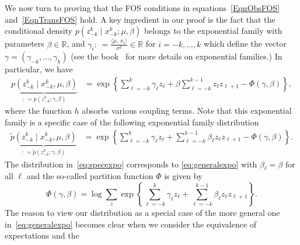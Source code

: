\documentclass[twoside,11pt]{article}
\newcommand{\inprod}[2]{\ensuremath{\langle #1 , \, #2 \rangle}}
\newcommand{\generalp}{\tilde{p}}
\newcommand{\paramobs}{\mu}
\newcommand{\paramtrans}{\beta}
\newcommand{\paramgamma}{\gamma}
\newcommand{\expcum}{\Phi}
\newcommand{\real}{\ensuremath{\mathbb{R}}}
\newcommand{\defn}{: \, = }
\newcommand{\kdim}{\ensuremath{k}}
\begin{document}
We now turn to proving that the FOS conditions in
equations~\eqref{EqnObsFOS} and~\eqref{EqnTransFOS} hold.  A key
ingredient in our proof is the fact that the conditional density
$p(z_{-\kdim}^\kdim \mid x_{-\kdim}^\kdim; \paramobs, \paramtrans)$
belongs to the exponential family with parameters $\paramtrans \in
\real$, and $\paramgamma_i \defn \frac{\inprod{\mu}{x_i}}{\sigma^2}
\in \real$ for $i=-k, \ldots, \kdim$ which define the vector
$\paramgamma = (\gamma_{-k}, \dots, \gamma_k)$ (see the book~\cite{WaiJor08}
for more details on exponential families.)  In particular, we have
\begin{align}
\label{eq:specexpo}
\underbrace{p(z_{-k}^k \mid x_{-k}^k,\paramobs, \paramtrans)}_{ \defn
  p(z_{-k}^k; \paramgamma, \paramtrans)} & = \exp \left\{
\sum_{\ell=-k}^k \paramgamma_{\ell} z_{\ell} + \paramtrans \sum_{\ell =
  -k}^{k-1} z_{\ell}z_{\ell+1} - \expcum(\paramgamma, \paramtrans)
\right\},
\end{align} 
where the function $h$ absorbs various coupling terms.
Note that this exponential family is a specific case of the following
exponential family distribution
\begin{align}
\label{eq:generalexpo}
\underbrace{\generalp (z_{-k}^k \mid x_{-k}^k,\paramobs, \paramtrans)}_{ \defn
  \generalp(z_{-k}^k; \paramgamma, \paramtrans)} & = \exp \left\{
\sum_{\ell=-k}^k \paramgamma_{\ell} z_{\ell} +  \sum_{\ell =
  -k}^{k-1} \paramtrans_{\ell} z_{\ell}z_{\ell+1} - \expcum(\paramgamma, \paramtrans)
\right\}.
\end{align} 
The distribution in~\eqref{eq:specexpo} corresponds to 
\eqref{eq:generalexpo} 
with $\paramtrans_\ell = \paramtrans$ for all $\ell$
 and the
so-called partition function $\expcum$ is given by
\begin{equation*}
\expcum (\gamma, \paramtrans) = \log \sum_z \exp \left\{ \sum_{\ell=-k}^k
\paramgamma_{\ell} z_{\ell} + 
\sum_{\ell=-k}^{k-1} \paramtrans_{\ell} z_{\ell}
z_{\ell+1} \right\}.
\end{equation*}
The reason to view our distribution as a special case of the more
general one in~\eqref{eq:generalexpo} becomes clear when 
we consider the equivalence of expectations and the 
\end{document}
